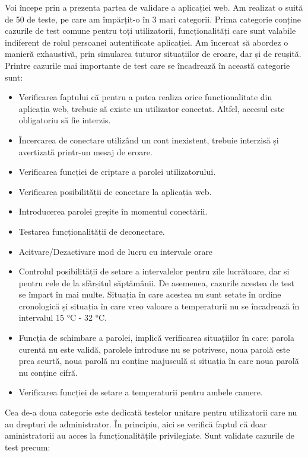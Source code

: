 	Voi începe prin a prezenta partea de validare a aplicației web. Am realizat o suită de 50 de teste, pe care am împărțit-o în 3 mari categorii. Prima categorie conține cazurile de test comune pentru toți utilizatorii, funcționalități care sunt valabile indiferent de rolul persoanei autentificate aplicației. Am încercat să abordez o manieră exhaustivă, prin simularea tuturor situațiilor de eroare, dar și de reușită. Printre cazurile mai importante de test care se încadrează în această categorie sunt:

	\begin{itemize}
			\setlength{\itemindent}{2em}
			\itemsep0em
			\item Verificarea faptului că pentru a putea realiza orice funcționalitate din aplicația web, trebuie să existe un utilizator conectat. Altfel, accesul este obligatoriu să fie interzis.
			\item Încercarea de conectare utilizând un cont inexistent, trebuie interzisă și avertizată printr-un mesaj de eroare.
			\item Verificarea funcției de criptare a parolei utilizatorului.
			\item Verificarea posibilității de conectare la aplicația web.
			\item Introducerea parolei greșite în momentul conectării.
			\item Testarea funcționalității de deconectare.
			\item Acitvare/Dezactivare mod de lucru cu intervale orare
			\item Controlul posibilității de setare a intervalelor pentru zile lucrătoare, dar si pentru cele de la sfârșitul săptămânii. De asemenea, cazurile acestea de test se împart în mai multe. Situația în care acestea nu sunt setate în ordine cronologică și situația în care vreo valoare a temperaturii nu se încadrează în intervalul 15 °C - 32 °C.
			\item Funcția de schimbare a parolei, implică verificarea situațiilor în care: parola curentă nu este validă, parolele introduse nu se potrivesc, noua parolă este prea scurtă, noua parolă nu conține majusculă și situația în care noua parolă nu conține cifră.
			\item Verificarea funcției de setare a temperaturii pentru ambele camere.
	\end{itemize} 

\vspace{2em}

	Cea de-a doua categorie este dedicată testelor unitare pentru utilizatorii care nu au drepturi de administrator. În principiu, aici se verifică faptul că doar aministratorii au acces la funcționalitățile privilegiate. Sunt validate cazurile de test precum:
 
